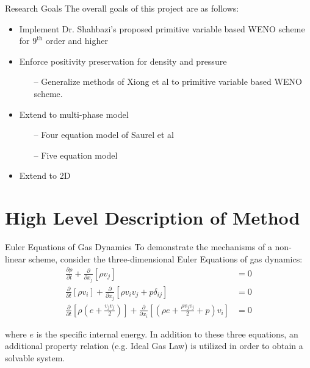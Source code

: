 \documentclass[9pt]{beamer}
\begin{document}
\begin{frame}{Research Goals}
  The overall goals of this project are as follows:
  \begin{itemize}
  \item Implement Dr. Shahbazi's proposed primitive variable based WENO scheme \cite{Shahbazi} for $9^{\text{th}}$ order and higher
  \item Enforce positivity preservation for density and pressure
  \begin{itemize}
  \item[--] Generalize methods of Xiong et al \cite{Positivity2014} to primitive variable based WENO scheme.
  \end{itemize}
  \item Extend to multi-phase model
  \begin{itemize}
  \item[--] Four equation model of Saurel et al \cite{FourEquationModel}
  \item[--] Five equation model \cite{FiveEquationModel}
  \end{itemize}
  \item Extend to 2D
  \end{itemize}
\end{frame}

\section{High Level Description of Method}

\begin{frame}{Euler Equations of Gas Dynamics}
To demonstrate the mechanisms of a non-linear scheme, consider the three-dimensional Euler Equations of gas dynamics:
\begin{align}
\frac{\partial \rho}{\partial t}+\frac{\partial}{\partial x_j}[\rho v_j] &=0\label{eq:MassBalance}\\
\frac{\partial}{\partial t}[\rho v_i]+\frac{\partial}{\partial x_j}[\rho v_iv_j+p\delta_{ij}]&=0\label{eq:MomentaBalance}\\
\frac{\partial}{\partial t}[\rho(e+\tfrac{v_jv_j}{2})]+\frac{\partial}{\partial x_i}[(\rho e+\tfrac{\rho v_jv_j}{2} +p)v_i]&=0\label{eq:EnergyBalance}
\end{align}

where $e$ is the specific internal energy. In addition to these three equations, an additional property relation (e.g. Ideal Gas Law) is utilized in order to obtain a solvable system. 
\end{frame}
\end{document}

